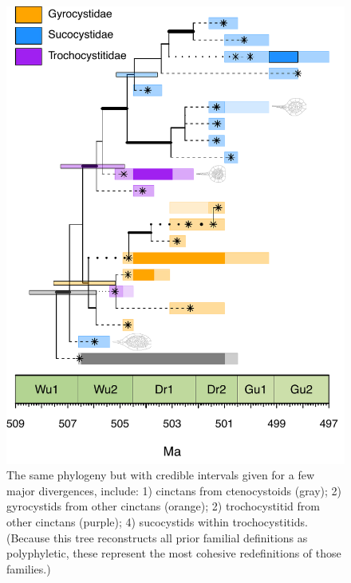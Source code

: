 \documentclass{article}
\begin{document}
\begin{figure}
  \includegraphics[width=\textwidth]{figures/Pancakes over Time Uncertainly.pdf}

  \caption{The same phylogeny but with credible intervals given for a few major divergences, include: 1) cinctans from ctenocystoids (gray); 2)  gyrocystids from other cinctans (orange);  2)  trochocystitid from other cinctans (purple);  4) sucocystids within trochocystitids.  (Because this tree reconstructs all prior familial definitions as polyphyletic, these represent the most cohesive redefinitions of those families.)}
\end{figure}
\end{document}

